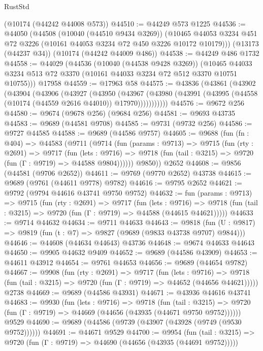 \begin{lexlean}{RustStd}
\begin{coremodule}
    (@10174 (@44242 @44008 @573))
@44510 := @44249 @573 @1225
@44536 := @44050
    (@44508
      (@10040 (@44510 @9434 @3269))
      (@10465 @44053 @3234 @451 @72 @3226 (@10161 @44053 @3234 @72 @450 @3226 @10172 @10179)))
    (@13173 (@44237 @34))
    (@10174 (@44242 @44009 @486))
@44538 := @44249 @486 @1732
@44558 := @44029
    (@44536
      (@10040 (@44538 @9428 @3269))
      (@10465 @44033 @3234 @513 @72 @3370 (@10161 @44033 @3234 @72 @512 @3370 @10751 @10755)))
    @17958
@44559 := @17963 @58
@44575 := @43836
    (@43861
      (@43902
        (@43904
          (@43906
            (@43927
              (@43950
                (@43967
                  (@43980 (@43991 (@43995 (@44558 (@10174 (@44559 @2616 @44010)) @17970)))))))))))
@44576 := @9672 @256
@44580 := @9674 (@9678 @256) (@9684 @256)
@44581 := @9693 @43735
@44583 := @9689 (@44581 @9708)
@44585 := @9731 (@9732 @256)
@44586 := @9727 @44585
@44588 := @9689 (@44586 @9757)
@44605 := @9688
    (fun (fn : @404) =>
    @44583
      (@9711
        (@9714
          (fun (params : @9713) =>
          @9715
            (fun (rty : @2691) =>
            @9717
              (fun (lets : @9716) =>
              @9718 (fun (tail : @3215) => @9720 (fun (Γ : @9719) => @44588 @9804))))))
        @9850))
    @2652
@44608 := @9856 (@44581 (@9706 @2652))
@44611 := @9769 (@9770 @2652) @43738
@44615 := @9689 (@9761 (@44611 @9778) @9782)
@44616 := @9795 @2652
@44621 := @9792 (@9794 @44616 @43741 @9750 @9752)
@44632 := fun (params : @9713) =>
  @9715
    (fun (rty : @2691) =>
    @9717
      (fun (lets : @9716) =>
      @9718 (fun (tail : @3215) => @9720 (fun (Γ : @9719) => @44588 (@44615 @44621)))))
@44633 := @9714 @44632
@44634 := @9711 @44633
@44643 := @9818
    (fun (U : @9817) => @9819 (fun (t : @7) => @9827 (@9689 (@9833 @43738 @9707) @9844)))
@44646 := @44608 (@44634 @44643) @43736
@44648 := @9674 @44633 @44643
@44650 := @9905 @44632 @9409
@44652 := @9689 (@44586 @43909)
@44653 := @44611 @43912
@44654 := @9761 @44653
@44656 := @9689 (@44654 @9782)
@44667 := @9908
    (fun (rty : @2691) =>
    @9717
      (fun (lets : @9716) =>
      @9718 (fun (tail : @3215) => @9720 (fun (Γ : @9719) => @44652 (@44656 @44621)))))
    @2738
@44669 := @9689 (@44586 @43931)
@44671 := @43936 @44616 @43741
@44683 := @9930
    (fun (lets : @9716) =>
    @9718
      (fun (tail : @3215) =>
      @9720 (fun (Γ : @9719) => @44669 (@44656 (@43935 (@44671 @9750 @9752))))))
    @9529
@44690 := @9689 (@44586 (@9739 (@43907 (@43928 (@9749 (@9530 @9752))))))
@44691 := @44671 @9529
@44700 := @9954
    (fun (tail : @3215) => @9720 (fun (Γ : @9719) => @44690 (@44656 (@43935 (@44691 @9752)))))

\end{coremodule}
\end{lexlean}
